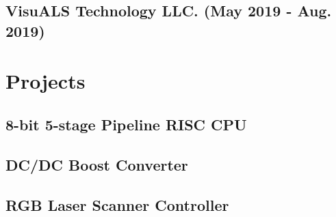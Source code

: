 \documentclass{article}
\begin{document}
	\subsection{VisuALS Technology LLC. (May 2019 - Aug. 2019)}

\section{Projects}
	\subsection{8-bit 5-stage Pipeline RISC CPU}
	\subsection{DC/DC Boost Converter}
	\subsection{RGB Laser Scanner Controller}
\end{document}
